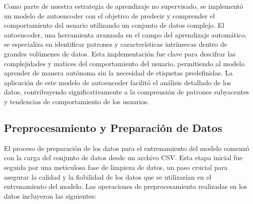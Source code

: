 Como parte de nuestra estrategia de aprendizaje no supervisado, se implementó un modelo de autoencoder con el objetivo de predecir y comprender el comportamiento del usuario utilizando un conjunto de datos complejo. El autoencoder, una herramienta avanzada en el campo del aprendizaje automático, se especializa en identificar patrones y características intrínsecas dentro de grandes volúmenes de datos. Esta implementación fue clave para descifrar las complejidades y matices del comportamiento del usuario, permitiendo al modelo aprender de manera autónoma sin la necesidad de etiquetas predefinidas. La aplicación de este modelo de autoencoder facilitó el análisis detallado de los datos, contribuyendo significativamente a la comprensión de patrones subyacentes y tendencias de comportamiento de los usuarios.

\subsection{Preprocesamiento y Preparación de Datos}
El proceso de preparación de los datos para el entrenamiento del modelo comenzó con la carga del conjunto de datos desde un archivo CSV. Esta etapa inicial fue seguida por una meticulosa fase de limpieza de datos, un paso crucial para asegurar la calidad y la fiabilidad de los datos que se utilizarían en el entrenamiento del modelo. Las operaciones de preprocesamiento realizadas en los datos incluyeron las siguientes:

